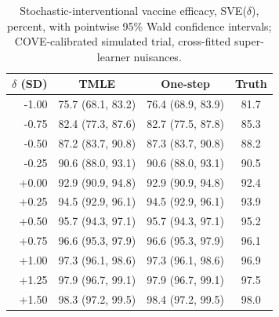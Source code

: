 \begin{table}

\caption{Stochastic-interventional vaccine efficacy, SVE($\delta$), percent, with pointwise 95\% Wald confidence intervals; COVE-calibrated simulated trial, cross-fitted super-learner nuisances.}
\centering
\begin{tabular}[t]{rccc}
\toprule
$\delta$ (SD) & TMLE & One-step & Truth\\
\midrule
-1.00 & 75.7 (68.1, 83.2) & 76.4 (68.9, 83.9) & 81.7\\
-0.75 & 82.4 (77.3, 87.6) & 82.7 (77.5, 87.8) & 85.3\\
-0.50 & 87.2 (83.7, 90.8) & 87.3 (83.7, 90.8) & 88.2\\
-0.25 & 90.6 (88.0, 93.1) & 90.6 (88.0, 93.1) & 90.5\\
+0.00 & 92.9 (90.9, 94.8) & 92.9 (90.9, 94.8) & 92.4\\
\addlinespace
+0.25 & 94.5 (92.9, 96.1) & 94.5 (92.9, 96.1) & 93.9\\
+0.50 & 95.7 (94.3, 97.1) & 95.7 (94.3, 97.1) & 95.2\\
+0.75 & 96.6 (95.3, 97.9) & 96.6 (95.3, 97.9) & 96.1\\
+1.00 & 97.3 (96.1, 98.6) & 97.3 (96.1, 98.6) & 96.9\\
+1.25 & 97.9 (96.7, 99.1) & 97.9 (96.7, 99.1) & 97.5\\
\addlinespace
+1.50 & 98.3 (97.2, 99.5) & 98.4 (97.2, 99.5) & 98.0\\
\bottomrule
\end{tabular}
\end{table}

